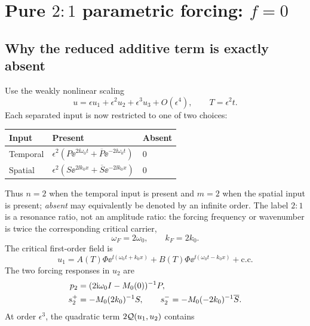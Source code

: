 \section{Pure \texorpdfstring{$2{:}1$}{2:1} parametric forcing:
\texorpdfstring{$f=0$}{f=0}}
\label{sec:all-forced}

\subsection{Why the reduced additive term is exactly absent}

Use the weakly nonlinear scaling
\begin{equation}
 u=\epsilon u_1+\epsilon^2u_2+\epsilon^3u_3+O(\epsilon^4),
 \qquad T=\epsilon^2t.
 \label{eq:pure21-scaling}
\end{equation}
Each separated input is now restricted to one of two choices:
\begin{center}
\begin{tabular}{@{}lll@{}}
\toprule
Input & Present & Absent\\
\midrule
Temporal &
$\epsilon^2(P\ee^{2\ii\omega_0t}+\overline P\ee^{-2\ii\omega_0t})$ &
$0$\\
Spatial &
$\epsilon^2(S\ee^{2\ii k_0x}+\overline S\ee^{-2\ii k_0x})$ &
$0$\\
\bottomrule
\end{tabular}
\end{center}
Thus $n=2$ when the temporal input is present and $m=2$ when the spatial
input is present; \emph{absent} may equivalently be denoted by an infinite
order.  The label $2{:}1$ is a resonance ratio, not an amplitude ratio: the
forcing frequency or wavenumber is twice the corresponding critical carrier,
\begin{equation}
 \omega_F=2\omega_0,\qquad k_F=2k_0.
 \label{eq:pure21-definition}
\end{equation}
The critical first-order field is
\begin{equation}
 u_1=A(T)\Phi\ee^{\ii(\omega_0t+k_0x)}
 +B(T)\Phi\ee^{\ii(\omega_0t-k_0x)}+\mathrm{c.c.}
 \label{eq:pure21-critical-field}
\end{equation}
The two forcing responses in $u_2$ are
\begin{align}
 p_2&=(2\mathrm{i}\omega_0I-M_0(0))^{-1}P,\notag\\
 s_2^+&=-M_0(2k_0)^{-1}S,\qquad
 s_2^-=-M_0(-2k_0)^{-1}\overline S .
 \label{eq:pure21-responses}
\end{align}
At order $\epsilon^3$, the quadratic term
$2\mathcal Q(u_1,u_2)$ contains
